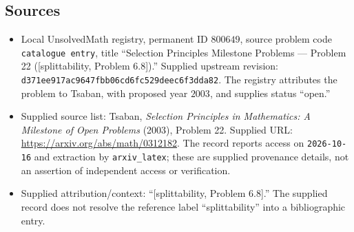 \documentclass[11pt]{article}
\begin{document}
\subsection{Sources}
\begin{itemize}
\item Local UnsolvedMath registry, permanent ID \(800649\), source problem code \texttt{catalogue entry}, title ``Selection Principles Milestone Problems --- Problem 22 ([splittability, Problem 6.8]).'' Supplied upstream revision: \texttt{d371ee917ac9647fbb06cd6fc529deec6f3dda82}. The registry attributes the problem to Tsaban, with proposed year \(2003\), and supplies status ``open.''
\item Supplied source list: Tsaban, \emph{Selection Principles in Mathematics: A Milestone of Open Problems} (2003), Problem 22. Supplied URL: \url{https://arxiv.org/abs/math/0312182}. The record reports access on \texttt{2026-10-16} and extraction by \texttt{arxiv\_latex}; these are supplied provenance details, not an assertion of independent access or verification.
\item Supplied attribution/context: ``[splittability, Problem 6.8].'' The supplied record does not resolve the reference label ``splittability'' into a bibliographic entry.
\end{itemize}
\end{document}
